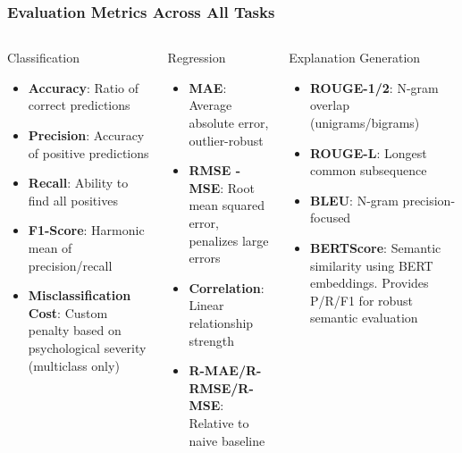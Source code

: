 \documentclass[aspectratio=169]{beamer}
\begin{document}
\begin{frame}
  \frametitle{Evaluation Metrics Across All Tasks}
  \begin{columns}[T]
    \begin{column}{0.32\textwidth}
      \begin{block}{Classification}
        \small
        \begin{itemize}
          \item \textbf{Accuracy}: Ratio of correct predictions
          \item \textbf{Precision}: Accuracy of positive predictions
          \item \textbf{Recall}: Ability to find all positives
          \item \textbf{F1-Score}: Harmonic mean of precision/recall
          \item \textbf{Misclassification Cost}: Custom penalty based on psychological severity (multiclass only)
        \end{itemize}
      \end{block}
    \end{column}
    
    \begin{column}{0.32\textwidth}
      \begin{block}{Regression}
        \small
        \begin{itemize}
          \item \textbf{MAE}: Average absolute error, outlier-robust
          \item \textbf{RMSE - MSE}: Root mean squared error, penalizes large errors
          \item \textbf{Correlation}: Linear relationship strength
          \item \textbf{R-MAE/R-RMSE/R-MSE}: Relative to naive baseline
        \end{itemize}
      \end{block}
    \end{column}
    
    \begin{column}{0.32\textwidth}
      \begin{block}{Explanation Generation}
        \small
        \begin{itemize}
          \item \textbf{ROUGE-1/2}: N-gram overlap (unigrams/bigrams)
          \item \textbf{ROUGE-L}: Longest common subsequence
          \item \textbf{BLEU}: N-gram precision-focused
          \item \textbf{BERTScore}: Semantic similarity using BERT embeddings. Provides P/R/F1 for robust semantic evaluation
        \end{itemize}
      \end{block}
    \end{column}
  \end{columns}
\end{frame}
\end{document}
